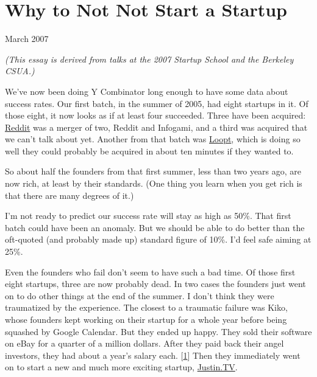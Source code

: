 \chapter{Why to Not Not Start a Startup}


            
              
                


                  
                    March 2007

\emph{(This essay is derived from talks at the 2007 Startup
                      School and the Berkeley CSUA.)}

We've now been doing Y Combinator long enough
                    to have some data about success rates. Our first batch, in
                    the summer of 2005, had eight startups in it. Of those
                    eight, it now looks as if at least four succeeded. Three
                    have been acquired:
                    \href{http://reddit.com}{Reddit} was a merger of two,
                    Reddit and Infogami, and a third was acquired that we can't
                    talk about yet. Another from that batch was
                    \href{http://loopt.com}{Loopt}, which is doing so well
                    they could probably be acquired in about ten minutes if they
                    wanted to.

So about half the founders from that
                    first summer, less than two years ago, are now rich, at
                    least by their standards. (One thing you learn when you get
                    rich is that there are many degrees of it.)

I'm
                    not ready to predict our success rate will stay as high as
                    50\%. That first batch could have been an anomaly. But we
                    should be able to do better than the oft-quoted (and
                    probably made up) standard figure of 10\%. I'd feel safe
                    aiming at 25\%.

Even the founders who fail don't
                    seem to have such a bad time. Of those first eight startups,
                    three are now probably dead. In two cases the founders just
                    went on to do other things at the end of the summer. I don't
                    think they were traumatized by the experience. The closest
                    to a traumatic failure was Kiko, whose founders kept working
                    on their startup for a whole year before being squashed by
                    Google Calendar. But they ended up happy. They sold their
                    software on eBay for a quarter of a million dollars. After
                    they paid back their angel investors, they had about a
                    year's salary each.
                    [\href{\#f1n}{1}]
                    Then they immediately went on to start a new and much more
                    exciting startup,
                    \href{http://justin.tv}{Justin.TV}.


